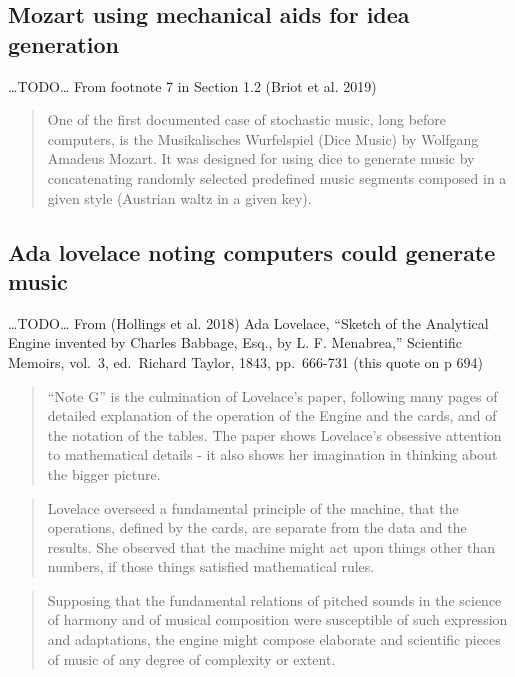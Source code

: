\documentclass[12pt,a4paper,]{report}
\begin{document}
\hypertarget{mozart-using-mechanical-aids-for-idea-generation}{%
\subsection{Mozart using mechanical aids for idea
generation}\label{mozart-using-mechanical-aids-for-idea-generation}}

\ldots TODO\ldots{} From footnote 7 in Section 1.2 (Briot et al. 2019)

\begin{quote}
One of the first documented case of stochastic music, long before
computers, is the Musikalisches Wurfelspiel (Dice Music) by Wolfgang
Amadeus Mozart. It was designed for using dice to generate music by
concatenating randomly selected predefined music segments composed in a
given style (Austrian waltz in a given key).
\end{quote}

\hypertarget{ada-lovelace-noting-computers-could-generate-music}{%
\subsection{Ada lovelace noting computers could generate
music}\label{ada-lovelace-noting-computers-could-generate-music}}

\ldots TODO\ldots{} From (Hollings et al. 2018) Ada Lovelace, ``Sketch
of the Analytical Engine invented by Charles Babbage, Esq., by L. F.
Menabrea,'' Scientific Memoirs, vol.~3, ed.~Richard Taylor, 1843,
pp.~666-731 (this quote on p 694)

\begin{quote}
``Note G'' is the culmination of Lovelace's paper, following many pages
of detailed explanation of the operation of the Engine and the cards,
and of the notation of the tables. The paper shows Lovelace's obsessive
attention to mathematical details - it also shows her imagination in
thinking about the bigger picture.
\end{quote}

\begin{quote}
Lovelace overseed a fundamental principle of the machine, that the
operations, defined by the cards, are separate from the data and the
results. She observed that the machine might act upon things other than
numbers, if those things satisfied mathematical rules.
\end{quote}

\begin{quote}
Supposing that the fundamental relations of pitched sounds in the
science of harmony and of musical composition were susceptible of such
expression and adaptations, the engine might compose elaborate and
scientific pieces of music of any degree of complexity or extent.
\end{quote}
\end{document}
